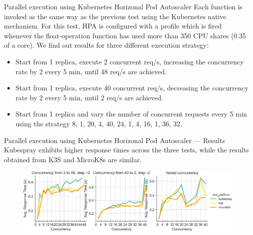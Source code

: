\begin{frame}{Parallel execution using Kubernetes Horizonal Pod Autoscaler}
Each function is invoked as the same way as the previous test using the Kubernetes native mechanism. For this test, HPA is configured with a profile which is fired whenever the float-operation function has used more than 350 CPU shares (0.35 of a core). \pause
We find out results for three different execution strategy:

\begin{itemize}
    \item Start from 1 replica, execute 2 concurrent req/s, increasing the concurrency rate by 2 every 5 min, until 48 req/s are achieved.
    \item Start from 1 replica, execute 40 concurrent req/s, decreasing the concurrency rate by 2 every 5 min, until 2 req/s are achieved.
    \item Start from 1 replica and vary the number of concurrent requests every 5 min using the strategy 8, 1, 20, 4, 40, 24, 1, 4, 16, 1, 36, 32.
\end{itemize}
\end{frame}


\begin{frame}{Parallel execution using Kubernetes Horizonal Pod Autoscaler  — Results}
Kubespray exhibits higher response times across the three tests, while the results obtained from K3S and MicroK8s are similar.

\begin{figure}
    \centering
    \includegraphics[width=1\linewidth]{static/11227_2022_4430_Fig8_HTML.jpg}
\end{figure}
\end{frame}

